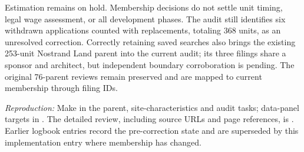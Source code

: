 Estimation remains on hold. Membership decisions do not settle unit timing, legal wage assessment, or all development phases. The audit still identifies six withdrawn applications counted with replacements, totaling 368 units, as an unresolved correction. Correctly retaining saved searches also brings the existing 253-unit Nostrand Land parent into the current audit; its three filings share a sponsor and architect, but independent boundary corroboration is pending. The original 76-parent reviews remain preserved and are mapped to current membership through filing IDs.

\textit{Reproduction:} Make in the parent, site-characteristics and audit tasks; data-panel targets in . The detailed review, including source URLs and page references, is . Earlier logbook entries record the pre-correction state and are superseded by this implementation entry where membership has changed.
